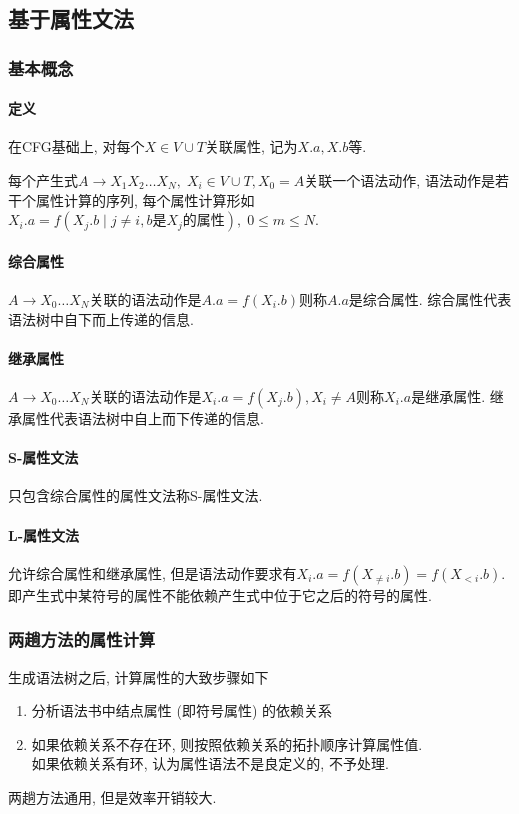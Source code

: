 \documentclass{ctexart}
\begin{document}
\subsection{基于属性文法}
\subsubsection{基本概念}
\paragraph{定义}
    在CFG基础上, 对每个$X \in V \cup T$关联属性, 记为$X.a, X.b$等.\par
    每个产生式$A\to X_1 X_2 \ldots X_N,\; X_i \in V \cup T, X_0 = A$关联一个语法动作,
    语法动作是若干个属性计算的序列, 每个属性计算形如$X_i.a = f(X_j.b \;|\; j \neq i, b\text{是}X_j\text{的属性}),\; 0 \le m \le N$.
\paragraph{综合属性} $A \to X_0 \ldots X_N$关联的语法动作是$A.a = f(X_i.b)$则称$A.a$是综合属性.
    综合属性代表语法树中自下而上传递的信息.
\paragraph{继承属性} $A \to X_0 \ldots X_N$关联的语法动作是$X_i.a = f(X_j.b),X_i \neq A$则称$X_i.a$是继承属性.
    继承属性代表语法树中自上而下传递的信息.
\paragraph{S-属性文法} 只包含综合属性的属性文法称S-属性文法.
\paragraph{L-属性文法} 允许综合属性和继承属性, 但是语法动作要求有$X_i.a = f(X_{\neq i}.b) =f(X_{< i}.b)$.
    即产生式中某符号的属性不能依赖产生式中位于它之后的符号的属性.

\subsubsection{两趟方法的属性计算}
    生成语法树之后, 计算属性的大致步骤如下
    \begin{enumerate}
        \item 分析语法书中结点属性 (即符号属性) 的依赖关系
        \item 如果依赖关系不存在环, 则按照依赖关系的拓扑顺序计算属性值.\\
        如果依赖关系有环, 认为属性语法不是良定义的, 不予处理.\par
    \end{enumerate}
    两趟方法通用, 但是效率开销较大.
\end{document}
